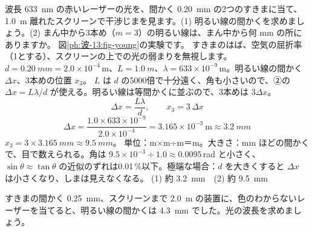 \begin{phreidai}[ヤングの実験のしまの間かく]
\label{ph:波-13:ex2}波長 \qty{633}{nm} の赤いレーザーの光を、間かく \qty{0.20}{mm} の2つのすきまに当て、\qty{1.0}{m} 離れたスクリーンで干渉じまを見ます。(1) 明るい線の間かくを求めましょう。(2) まん中から3本め（$m=3$）の明るい線は、まん中から何 mm の所にありますか。
\phbamen
図\ref{ph:波-13:fig-young}の実験です。
\phmushi
すきまのはば、空気の屈折率（1とする）、スクリーンの上での光の弱まりを無視します。
\phzu
$d=\qty{0.20}{mm}=2.0\times10^{-4}$\,m、$L=\qty{1.0}{m}$、$\lambda=633\times10^{-9}$\,m。明るい線の間かく $\Delta x$、3本めの位置 $x_3$。
\phriyu
$L$ は $d$ の5000倍で十分遠く、角も小さいので、②の $\Delta x=L\lambda/d$ が使える。明るい線は等間かくに並ぶので、3本めは $3\Delta x$。
\phtateru
\[ \Delta x=\frac{L\lambda}{d},\qquad x_3=3\,\Delta x \]
\phtoku
\[ \Delta x=\frac{1.0\times633\times10^{-9}}{2.0\times10^{-4}}=3.165\times10^{-3}\ \mathrm{m}\approx\qty{3.2}{mm} \]
$x_3=3\times\qty{3.165}{mm}\approx\qty{9.5}{mm}$。
\phtashikame
単位：m×m÷m＝m。大きさ：mm ほどの間かくで、目で数えられる。角は $9.5\times10^{-3}\div1.0\approx0.0095$\,rad と小さく、$\sin\theta\approx\tan\theta$ の近似のずれは0.01\,\%以下。極端な場合：$d$ を大きくすると $\Delta x$ は小さくなり、しまは見えなくなる。
\kotae (1) 約 \qty{3.2}{mm}　(2) 約 \qty{9.5}{mm}
\end{phreidai}
\begin{jibun}
すきまの間かく \qty{0.25}{mm}、スクリーンまで \qty{2.0}{m} の装置に、色のわからないレーザーを当てると、明るい線の間かくは \qty{4.3}{mm} でした。光の波長を求めましょう。
\end{jibun}

